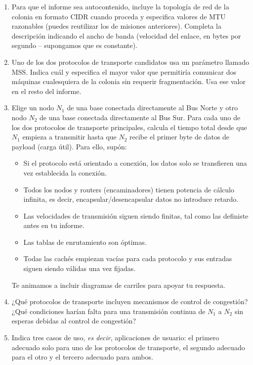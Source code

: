 \begin{enumerate}[itemsep=0.1cm]
\item Para que el informe sea autocontenido, incluye la topología de red de la colonia en formato CIDR cuando proceda
y especifica valores de MTU razonables (puedes reutilizar los de misiones anteriores). Completa la descripción
indicando el ancho de banda (velocidad del enlace, en bytes por segundo -- supongamos que es constante).

\item Uno de los dos protocolos de transporte candidatos usa un parámetro llamado MSS. Indica cuál y especifica el mayor
valor que permitiría comunicar dos máquinas cualesquiera de la colonia sin requerir fragmentación. Usa ese valor en el resto del informe.

\item Elige un nodo $N_1$ de una base conectada directamente al Bus Norte y otro nodo $N_2$ de una base conectada directamente al Bus Sur. Para cada uno de los dos protocolos de transporte principales, calcula el tiempo total desde que $N_1$ empieza a transmitir hasta que $N_2$ recibe el primer byte de datos de payload (carga útil). Para ello, supón:
  \begin{itemize}
  \item Si el protocolo está orientado a conexión, los datos solo se transfieren una vez establecida la conexión.
  \item Todos los nodos y routers (encaminadores) tienen potencia de cálculo infinita, es decir, encapsular/desencapsular datos no introduce retardo.
  \item Las velocidades de transmisión siguen siendo finitas, tal como las definiste antes en tu informe.
  \item Las tablas de enrutamiento son óptimas.
  \item Todas las cachés empiezan vacías para cada protocolo y sus entradas siguen siendo válidas una vez fijadas.
  \end{itemize}
Te animamos a incluir diagramas de carriles para apoyar tu respuesta.

\item ¿Qué protocolos de transporte incluyen mecanismos de control de congestión? ¿Qué condiciones harían falta para una transmisión continua de $N_1$ a $N_2$ sin esperas debidas al control de congestión?

\item Indica tres casos de uso, \textit{es decir}, aplicaciones de usuario: el primero adecuado solo para uno de los protocolos de transporte, el segundo adecuado para el otro y el tercero adecuado para ambos.
\end{enumerate}

